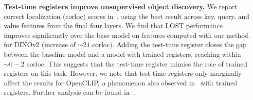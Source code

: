 \documentclass{article}
\begin{document}
\textbf{Test-time registers improve unsupervised object discovery.} We report correct localization (corloc) scores in~, using the best result across key, query, and value features from the final four layers. We find that LOST performance improves significantly over the base model on features computed with our method for DINOv2 (increase of ${\sim}{21}$ corloc). Adding the test-time register closes the gap between the baseline model and a model with trained registers, reaching within ${\sim}{0{-}2}$ corloc. This suggests that the test-time register mimics the role of trained registers on this task. However, we note that test-time registers only marginally affect the results for OpenCLIP, a phenomenon also observed in~\cite{darcet2024vision} with trained registers. Further analysis can be found in~.
\end{document}
